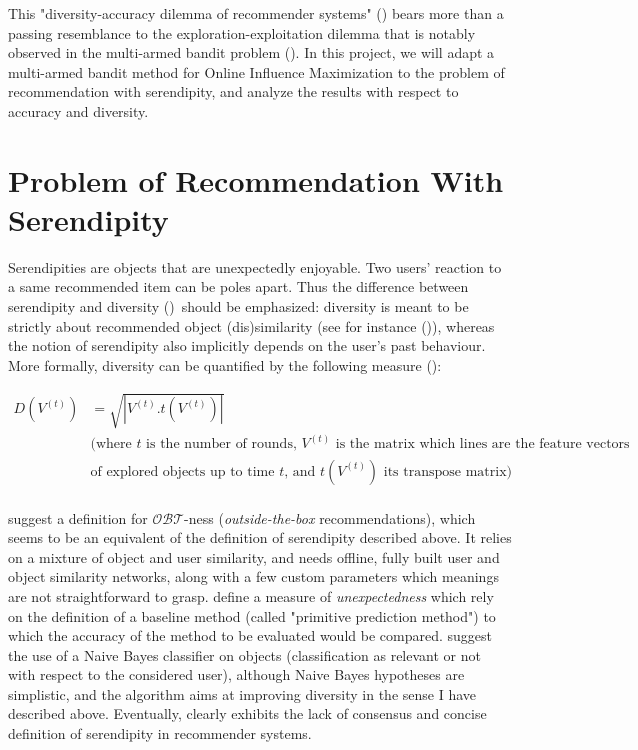 \documentclass{article}
\begin{document}
This "diversity-accuracy dilemma of recommender systems" (\cite{zhou2010solving}) bears more than a passing resemblance to the exploration-exploitation dilemma that is notably observed in the multi-armed bandit problem (\cite{auer2002finite}). In this project, we will adapt a multi-armed bandit method for Online Influence Maximization to the problem of recommendation with serendipity, and analyze the results with respect to accuracy and diversity.

\section{Problem of Recommendation With Serendipity}

Serendipities are objects that are unexpectedly enjoyable. Two users' reaction to a same recommended item can be poles apart. Thus the difference between serendipity and diversity (\cite{abbassi2009getting}) should be emphasized: diversity is meant to be strictly about recommended object (dis)similarity (see for instance (\cite{ziegler2005improving})), whereas the notion of serendipity also implicitly depends on the user's past behaviour. More formally, diversity can be quantified by the following measure (\cite{vie2016modeles}):

\begin{equation}\label{eq:01}
\begin{split}
D(V^{(t)}) & = \sqrt{|V^{(t)}.t(V^{(t)})|}\\
& \mbox{(where $t$ is the number of rounds, $V^{(t)}$ is the matrix which lines are the feature vectors}\\
& \mbox{of explored objects up to time $t$, and $t(V^{(t)})$ its transpose matrix)}\\
\end{split}
\end{equation}

\citet{abbassi2009getting} suggest a definition for $\mathscr{O}\mathscr{B}\mathscr{T}$-ness (\textit{outside-the-box} recommendations), which seems to be an equivalent of the definition of serendipity described above. It relies on a mixture of object and user similarity, and needs offline, fully built user and object similarity networks, along with a few custom parameters which meanings are not straightforward to grasp. \citet{murakami2007metrics} define a measure of \emph{unexpectedness} which rely on the definition of a baseline method (called "primitive prediction method") to which the accuracy of the method to be evaluated would be compared. \citet{iaquinta2008introducing} suggest the use of a Naive Bayes classifier on objects (classification as relevant or not with respect to the considered user), although Naive Bayes hypotheses are simplistic, and the algorithm aims at improving diversity in the sense I have described above. Eventually, \citet{kotkov2016survey} clearly exhibits the lack of consensus and concise definition of serendipity in recommender systems.
\end{document}

